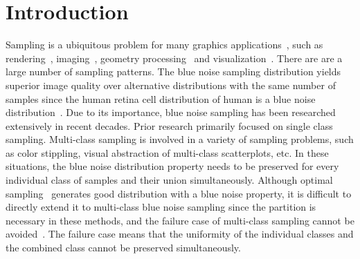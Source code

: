\section{Introduction}
Sampling is a ubiquitous problem for many graphics applications~\cite{Lagae:2008:CPDD},
such as rendering~\cite{Mitchell:1987:generating},
imaging~\cite{Robert:1988:dithering},
geometry processing~\cite{Oztireli:10:Spectral}
and visualization~\cite{chen:2014:visual}.
There are are
a large number of sampling patterns.
The blue noise sampling distribution yields superior
image quality over alternative distributions with the same
number of samples since the human retina cell distribution of
human is a blue noise distribution~\cite{Yellott:1983:retina}.
Due to its importance,
blue noise sampling has been researched extensively in recent decades.
Prior research primarily focused on single class sampling.
Multi-class  sampling is involved in a variety of sampling problems,
such as color stippling, visual abstraction of multi-class scatterplots,
etc.
In these situations,
the blue noise distribution property needs to be preserved for every individual class of samples
and their union simultaneously.
Although optimal
sampling~\cite{balzer:2009:capacity,chen:2012:variational,de:2012:blue}
 generates good distribution with a  blue noise property,
it is difficult to directly extend it to multi-class blue noise sampling since
the partition is necessary in these methods,
and the failure case of multi-class sampling cannot be avoided~\cite{wei:2010:multi,chen:2012:variational}.
 The failure case means that the uniformity of the individual classes and the combined class cannot be preserved simultaneously.



